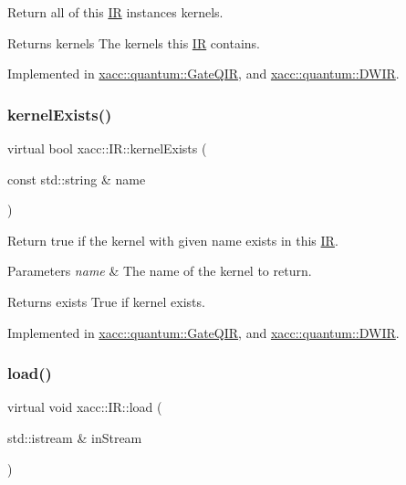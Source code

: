 Return all of this \hyperlink{a01175}{IR} instance\textquotesingle{}s kernels.

\begin{DoxyReturn}{Returns}
kernels The kernels this \hyperlink{a01175}{IR} contains. 
\end{DoxyReturn}


Implemented in \hyperlink{a01027_a4ace7ee5ebef84b1f39aaf5ed12c6cc6}{xacc\+::quantum\+::\+Gate\+Q\+IR}, and \hyperlink{a00979_a66e22c5dc95ec46045476864012ad08f}{xacc\+::quantum\+::\+D\+W\+IR}.

\mbox{\label{a01175_afc9ccf5126f3fed19c2e879133b2f6d8}} 
\subsubsection{\texorpdfstring{kernel\+Exists()}{kernelExists()}}
{\footnotesize\ttfamily virtual bool xacc\+::\+I\+R\+::kernel\+Exists (\begin{DoxyParamCaption}\item[{const std\+::string \&}]{name }\end{DoxyParamCaption})\hspace{0.3cm}{\ttfamily [pure virtual]}}

Return true if the kernel with given name exists in this \hyperlink{a01175}{IR}.


\begin{DoxyParams}{Parameters}
{\em name} & The name of the kernel to return. \\
\hline
\end{DoxyParams}
\begin{DoxyReturn}{Returns}
exists True if kernel exists. 
\end{DoxyReturn}


Implemented in \hyperlink{a01027_a692f95099caa7c024110a3f035941dca}{xacc\+::quantum\+::\+Gate\+Q\+IR}, and \hyperlink{a00979_ab5e8861d3bc0845bb015af6208f5f396}{xacc\+::quantum\+::\+D\+W\+IR}.

\mbox{\label{a01175_a444c2e4dc0faac500fb70fa93997e9bc}} 
\subsubsection{\texorpdfstring{load()}{load()}}
{\footnotesize\ttfamily virtual void xacc\+::\+I\+R\+::load (\begin{DoxyParamCaption}\item[{std\+::istream \&}]{in\+Stream }\end{DoxyParamCaption})\hspace{0.3cm}{\ttfamily [pure virtual]}}

